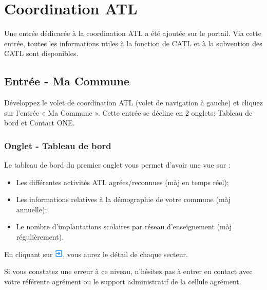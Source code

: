 \chapter{Coordination ATL}
Une entrée dédicacée à la coordination ATL a été ajoutée sur le portail. Via cette entrée, toutes les informations utiles à la fonction de CATL et à la subvention des CATL sont disponibles. 

\section{Entrée - Ma Commune}
Développez le volet de coordination ATL (volet de navigation à gauche) et cliquez sur l’entrée « Ma Commune ». Cette entrée se décline en 2 onglets: Tableau de bord et Contact ONE.



\subsection{Onglet - Tableau de bord}
Le tableau de bord du premier onglet vous permet d’avoir une vue sur : 

\begin{itemize}
\item Les différentes activités ATL agrées/reconnues (màj en temps réel);
\item Les informations relatives à la démographie de votre commune (màj annuelle);
\item Le nombre d’implantations scolaires par réseau d’enseignement (màj régulièrement). 
\end{itemize}

En cliquant sur \includegraphics[width=0.4cm]{Images/icon/consult_ma_commune.png}, vous aurez le détail de chaque secteur. 

\begin{conseil}
 Si vous constatez une erreur à ce niveau, n’hésitez pas à entrer en contact avec votre référente agrément ou le support administratif de la cellule agrément. 
\end{conseil}


